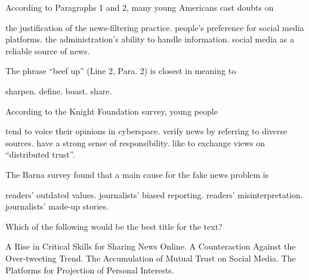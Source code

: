 \item According to Paragraphs 1 and 2, many young Americans cast doubts on
\begin{tasks}
	\task the justification of the news-filtering practice.
	\task people's preference for social media platforms.
	\task the administration's ability to handle information.
	\task social media as a reliable source of news.
\end{tasks}
\item The phrase ``beef up'' (Line 2, Para. 2) is closest in meaning to
\begin{tasks}
	\task sharpen.
	\task define.
	\task boast.
	\task share.
\end{tasks}
\item According to the Knight Foundation survey, young people
\begin{tasks}
	\task tend to voice their opinions in cyberspace.
	\task verify news by referring to diverse sources.
	\task have a strong sense of responsibility.
	\task like to exchange views on ``distributed trust''.
\end{tasks}
\item The Barna survey found that a main cause for the fake news problem is
\begin{tasks}
	\task readers' outdated values.
	\task journalists' biased reporting.
	\task readers' misinterpretation.
	\task journalists' made-up stories.
\end{tasks}
\item Which of the following would be the best title for the text?
\begin{tasks}
	\task A Rise in Critical Skills for Sharing News Online.
	\task A Counteraction Against the Over-tweeting Trend.
	\task The Accumulation of Mutual Trust on Social Media.
	\task The Platforms for Projection of Personal Interests.
\end{tasks}
